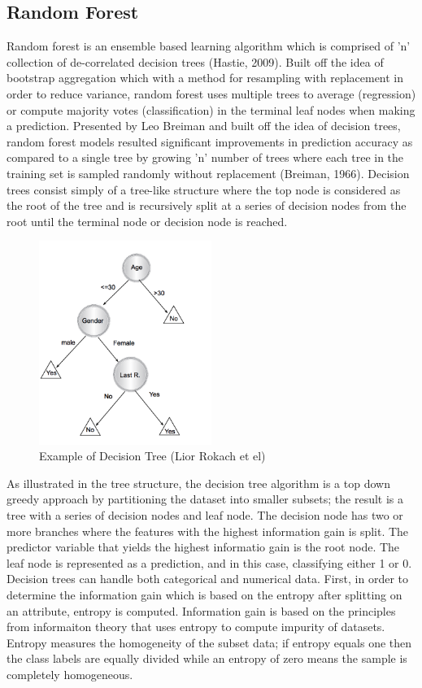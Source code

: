 \documentclass{llncs}
\begin{document}
\subsection{Random Forest}


Random forest is an ensemble based learning algorithm which is comprised of 'n' collection of de-correlated decision trees (Hastie, 2009). Built off the idea of bootstrap aggregation which with a method for resampling with replacement in order to reduce variance, random forest uses multiple trees to average (regression) or compute majority votes (classification) in the terminal leaf nodes when making a prediction. Presented by Leo Breiman and built off the idea of decision trees, random forest models resulted significant improvements in prediction accuracy as compared to a single tree by growing 'n' number of trees where each tree in the training set is sampled randomly without replacement (Breiman, 1966). Decision trees consist simply of a tree-like structure where the top node is considered as the root of the tree and is recursively split at a series of decision nodes from the root until the terminal node or decision node is reached. 


\begin{figure}
\centering
\includegraphics[width=0.5\textwidth]{decisiontree.png}
\caption{Example of Decision Tree (Lior Rokach et el)}
\end{figure}


As illustrated in the tree structure, the decision tree algorithm is a top down greedy approach by partitioning the dataset into smaller subsets; the result is a tree with a series of decision nodes and leaf node. The decision node has two or more branches where the features with the highest information gain is split. The predictor variable that yields the highest informatio gain is the root node. The leaf node is represented as a prediction, and in this case, classifying either 1 or 0. Decision trees can handle both categorical and numerical data. First, in order to determine the information gain which is based on the entropy after splitting on an attribute, entropy is computed. Information gain is based on the principles from informaiton theory that uses entropy to compute impurity of datasets. Entropy measures the homogeneity of the subset data; if entropy equals one then the class labels are equally divided while an entropy of zero means the sample is completely homogeneous. 
\end{document}
